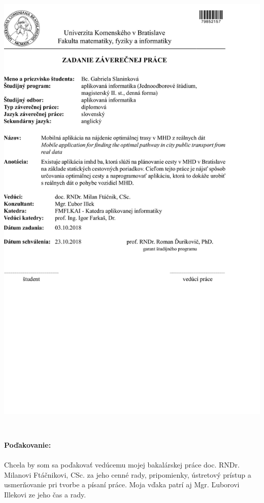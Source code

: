 \documentclass[12pt, oneside]{book}
\begin{document}
\newpage 
\thispagestyle{empty}
\hspace{-0.7cm}\includegraphics[width=1.1\textwidth]{images/zadanieDP}


\frontmatter

\setcounter{page}{3}
\newpage 
~

\vfill
{\bf Poďakovanie:}
\\ \\
Chcela by som sa poďakovať vedúcemu mojej bakalárskej práce doc. RNDr. Milanovi Ftáčnikovi, CSc. za jeho cenné rady, pripomienky, ústretový prístup a usmerňovanie pri
tvorbe a písaní práce. Moja vďaka patrí aj Mgr. Ľuborovi Illekovi ze jeho čas a rady.
\end{document}
